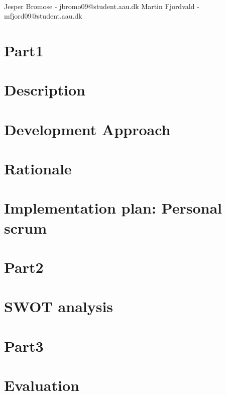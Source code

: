 \begin{align}
	
\end{align}



 
  \noindent Jesper Bromose - jbromo09@student.aau.dk \newline
  Martin Fjordvald - mfjord09@student.aau.dk \newline
  \section*{Part1}
  \section*{Description}
  
  \section*{Development Approach}
  
  \section*{Rationale}
  
  \section*{Implementation plan: Personal scrum}
  


  \section*{Part2}
  \section*{SWOT analysis}
  
  

  \section*{Part3}
  \section*{Evaluation}
  
  

